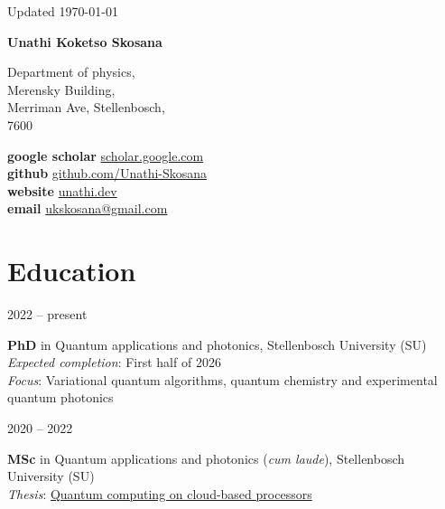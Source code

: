\documentclass[9pt]{extreport}
\newcommand*{\name}{Unathi Koketso Skosana}
\newcommand{\namefont}[1]{{\normalfont\bfseries\Huge{#1}}}
\newcommand{\entry}[2]{%
  \noindent%
  \begin{minipage}[t]{2.25cm}%
    \raggedright #1%
  \end{minipage}%
  \hspace{0.4cm}%
  \begin{minipage}[t]{\dimexpr\textwidth-2cm\relax}%
    #2%
  \end{minipage}%
  \vspace{0.25cm}%
}
\begin{document}
\begin{center}
	\vfill
	\small {Updated \monthyeardate\today}
\end{center}

\vspace{2em}

\namefont{\name}

\vspace{1em}

\begin{minipage}[t]{0.45\linewidth}
   Department of physics, \vspace*{0.2cm}\\
   Merensky Building, \vspace*{0.2cm} \\
   Merriman Ave, Stellenbosch, \vspace*{0.2cm} \\
   7600
\end{minipage}
\hfill
\begin{minipage}[t]{0.5\linewidth}
	\textbf{google scholar} \href{https://scholar.google.com/citations?user=SR58SqgAAAAJ}{scholar.google.com} \vspace*{0.2cm} \\
	\textbf{github}  \href{https://www.github.com/Unathi-Skosana}{github.com/Unathi-Skosana} \vspace*{0.2cm} \\
	\textbf{website} \href{https://www.unathi.dev}{unathi.dev} \vspace*{0.2cm} \\
	\textbf{email}   \href{mailto:ukskosana@gmail.com}{ukskosana@gmail.com} \hfill
\end{minipage}

\section*{Education}

\entry{2022 -- present}{\textbf{PhD} in Quantum applications and photonics, Stellenbosch University (SU) \\
\textit{Expected completion}: First half of 2026 \\
\textit{Focus}: Variational quantum algorithms, quantum chemistry and experimental quantum photonics}

\entry{2020 -- 2022}{\textbf{MSc} in Quantum applications and photonics (\textit{cum laude}), Stellenbosch University (SU) \\
  \textit{Thesis}: \href{https://github.com/Unathi-Skosana/mastersthesis}{Quantum computing on cloud-based processors}}
\end{document}
